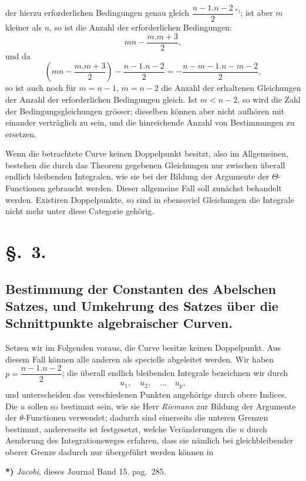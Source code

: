 \documentclass{article}
\begin{document}
der hierzu erforderlichen Bedingungen genau gleich $\dfrac{n-1.n-2}{2}\,{}^{*)}$; ist aber $m$ kleiner als $n$, so ist die Anzahl der erforderlichen Bedingungen:
\[ mn - \frac{m.m+3}{2}, \]
und da
\[ \left(mn - \frac{m.m+3}{2}\right) - \frac{n-1.n-2}{2} = -\frac{n-m-1.n-m-2}{2}, \]
so ist auch noch für $m = n-1$, $m = n-2$ die Anzahl der erhaltenen Gleichungen der Anzahl der erforderlichen Bedingungen gleich. Ist $m < n-2$, so wird die Zahl der Bedingungsgleichungen grösser; dieselben können aber nicht aufhören mit einander verträglich zu sein, und die hinreichende Anzahl von Bestimmungen zu ersetzen.

Wenn die betrachtete Curve keinen Doppelpunkt besitzt, also im Allgemeinen, bestehen die durch das Theorem gegebenen Gleichungen nur zwischen überall endlich bleibenden Integralen, wie sie bei der Bildung der Argumente der $\Theta$-Functionen gebraucht werden. Dieser allgemeine Fall soll zunächst behandelt werden. Existiren Doppelpunkte, so sind in ebensoviel Gleichungen die Integrale nicht mehr unter diese Categorie gehörig.

\section*{§.~3.}
\subsection*{Bestimmung der Constanten des Abelschen Satzes, und Umkehrung des Satzes über die Schnittpunkte algebraischer Curven.}

Setzen wir im Folgenden voraus, die Curve besitze keinen Doppelpunkt. Aus diesem Fall können alle anderen als specielle abgeleitet werden. Wir haben $p = \dfrac{n-1.n-2}{2}$; die überall endlich bleibenden Integrale bezeichnen wir durch
\[ u_{1}, \quad u_{2}, \quad \ldots \quad u_{p}, \]
und unterscheiden das verschiedenen Punkten angehörige durch obere Indices. Die $u$ sollen so bestimmt sein, wie sie Herr \emph{Riemann} zur Bildung der Argumente der $\theta$-Functionen verwendet; dadurch sind einerseits die unteren Grenzen bestimmt, andererseits ist festgesetzt, welche Veränderungen die $u$ durch Aenderung des Integrationsweges erfahren, dass sie nämlich bei gleichbleibender oberer Grenze dadurch nur übergeführt werden können in

\textbf{*)} \emph{Jacobi}, dieses Journal Band 15. pag.\ 285.
\end{document}
